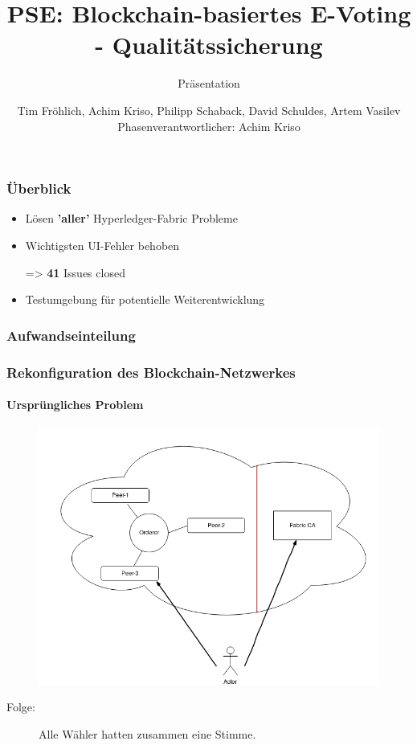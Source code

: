\documentclass{beamer}
\title[]{PSE: Blockchain-basiertes E-Voting - Qualitätssicherung}
\subtitle{Präsentation}
\author{Tim Fröhlich, Achim Kriso, Philipp Schaback, David Schuldes, Artem Vasilev\\ Phasenverantwortlicher: Achim Kriso}
\institute[]{KARLSRUHER INSTITUT FÜR TECHNOLOGIE (KIT)}
\begin{document}
\begin{frame}
\maketitle
\end{frame}

\begin{frame}
\frametitle{Überblick}
	\begin{itemize}
		\item Lösen \textbf{'aller'} Hyperledger-Fabric Probleme
		\item Wichtigsten UI-Fehler behoben
		\item[=>] \textbf{41} Issues closed
		\item Testumgebung für potentielle Weiterentwicklung
	\end{itemize}
\end{frame}

\begin{frame}
\frametitle{Aufwandseinteilung}
	\begin{figure}
		\centering
	\end{figure}
\end{frame}

\begin{frame}
\frametitle{Rekonfiguration des Blockchain-Netzwerkes}
\framesubtitle{Ursprüngliches Problem}
	\begin{figure}
		\vspace{-5pt}
		\centering
		\includegraphics[width=\textheight]{pictures/wolkendiagramm}
	\end{figure}
	\begin{description}
		\item[Folge:] Alle Wähler hatten zusammen eine Stimme.
	\end{description}
\end{frame}
\end{document}
